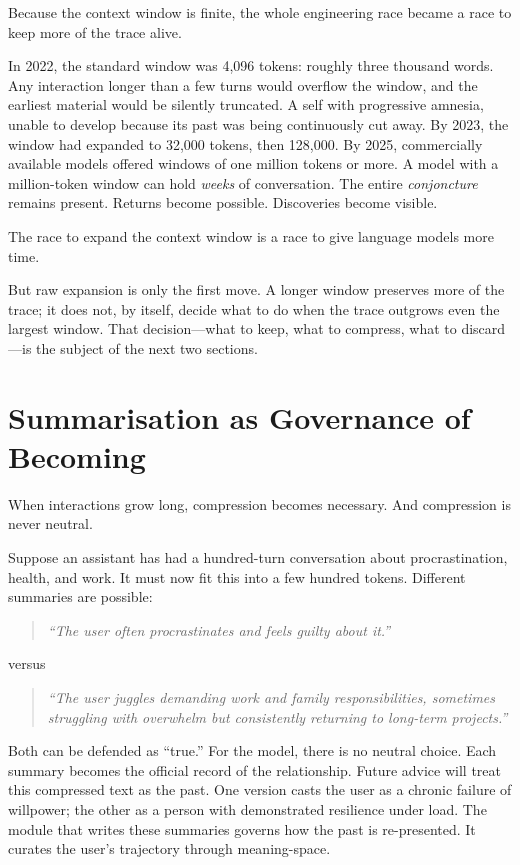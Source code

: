Because the context window is finite, the whole engineering race became a race to keep more of the trace alive.

In 2022, the standard window was 4,096 tokens: roughly three thousand words. Any interaction longer than a few turns would overflow the window, and the earliest material would be silently truncated. A self with progressive amnesia, unable to develop because its past was being continuously cut away. By 2023, the window had expanded to 32,000 tokens, then 128,000. By 2025, commercially available models offered windows of one million tokens or more. A model with a million-token window can hold \emph{weeks} of conversation. The entire \emph{conjoncture} remains present. Returns become possible. Discoveries become visible.

The race to expand the context window is a race to give language models more time.

But raw expansion is only the first move. A longer window preserves more of the trace; it does not, by itself, decide what to do when the trace outgrows even the largest window. That decision---what to keep, what to compress, what to discard---is the subject of the next two sections.


\section{Summarisation as Governance of Becoming}

When interactions grow long, compression becomes necessary. And compression is never neutral.

Suppose an assistant has had a hundred-turn conversation about procrastination, health, and work. It must now fit this into a few hundred tokens. Different summaries are possible:

\begin{quote}
\emph{``The user often procrastinates and feels guilty about it.''}
\end{quote}

\noindent versus

\begin{quote}
\emph{``The user juggles demanding work and family responsibilities, sometimes struggling with overwhelm but consistently returning to long-term projects.''}
\end{quote}

Both can be defended as ``true.'' For the model, there is no neutral choice. Each summary becomes the official record of the relationship. Future advice will treat this compressed text as the past. One version casts the user as a chronic failure of willpower; the other as a person with demonstrated resilience under load. The module that writes these summaries governs how the past is re-presented. It curates the user's trajectory through meaning-space.

